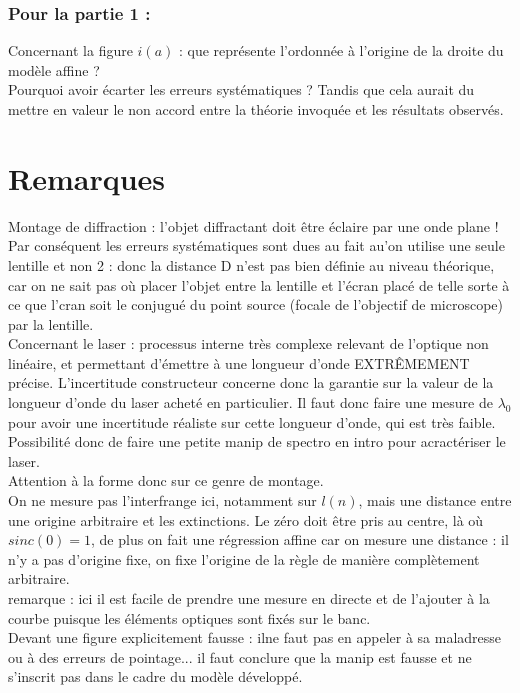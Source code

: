 \documentclass[12pt,prb,aps,epsf]{report}
\begin{document}
\subsubsection{Pour la partie 1 :}
Concernant la figure $i(a)$ : que représente l'ordonnée à l'origine de la droite du modèle affine ?\\ 

Pourquoi avoir écarter les erreurs systématiques ? Tandis que cela aurait du mettre en valeur le non accord entre la théorie invoquée et les résultats observés. \\

\section{Remarques}
Montage de diffraction : l'objet diffractant doit être éclaire par une onde plane !\\
Par conséquent les erreurs systématiques sont dues au fait au'on utilise une seule lentille et non 2 : donc la distance D n'est pas bien définie au niveau théorique, car on ne sait pas où placer l'objet entre la lentille et l'écran placé de telle sorte à ce que l'cran soit le conjugué du point source (focale de l'objectif de microscope) par la lentille.\\
Concernant le laser : processus interne très complexe relevant de l'optique non linéaire, et permettant d'émettre à une longueur d'onde EXTRÊMEMENT précise. L'incertitude constructeur concerne donc la garantie sur la valeur de la longueur d'onde du laser acheté en particulier. Il faut donc faire une mesure de $\lambda_0$ pour avoir une incertitude réaliste sur cette longueur d'onde, qui est très faible.\\
Possibilité donc de faire une petite manip de spectro en intro pour acractériser le laser.\\
Attention à la forme donc sur ce genre de montage.\\
On ne mesure pas l'interfrange ici, notamment sur $l(n)$, mais une distance entre une origine arbitraire et les extinctions. Le zéro doit être pris au centre, là où $sinc(0) = 1$, de plus on fait une régression affine car on mesure une distance : il n'y a pas d'origine fixe, on fixe l'origine de la règle de manière complètement arbitraire.\\
remarque : ici il est facile de prendre une mesure en directe et de l'ajouter à la courbe puisque les éléments optiques sont fixés sur le banc.\\
Devant une figure explicitement fausse : ilne faut pas en appeler à sa maladresse ou à des erreurs de pointage... il faut conclure que la manip est fausse et ne s'inscrit pas dans le cadre du modèle développé.\\
\end{document}
